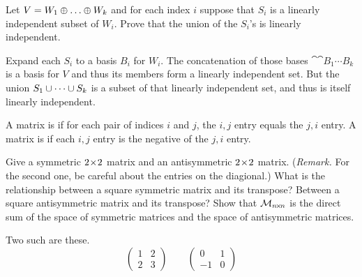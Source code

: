 \begin{exercises}
\begin{answer}
    \end{answer}
  \item 
    Let \( V=W_1\directsum\dots\directsum W_k \) and for each index
    \( i \) suppose that \( S_i \) is a linearly independent subset of
    \( W_i \).
    Prove that the union of the \( S_i \)'s is linearly independent.
    \begin{answer}
      Expand each \( S_i \) to a basis $B_i$ for \( W_i \).
      The concatenation of those bases $\cat{\cat{B_1}{\cdots}}{B_k}$
      is a basis for \( V \) and thus its members form a linearly independent
      set.
      But the union $S_1\cup\cdots\cup S_k$ is a subset 
      of that linearly independent set, and thus is
      itself linearly independent.  
     \end{answer}
  \item 
    A matrix is %
    if for each pair of indices \( i \) and
    \( j \), the \( i,j \) entry equals the \( j,i \) entry.
    A matrix is %
    if each \( i,j \) entry is the
    negative of the \( j,i \) entry.
    \begin{exparts}
      \partsitem Give a symmetric $2 \! \times \! 2$ matrix and an antisymmetric
        $2 \! \times \! 2$ matrix.
        (\textit{Remark.}
        For the second one, be careful about the entries on the diagional.)
      \partsitem What is the relationship between a square symmetric matrix and
        its transpose?
        Between a square antisymmetric matrix and its transpose?
      \partsitem Show that \( \mathcal{M}_{n \! \times \! n} \) is the direct sum of 
        the space of symmetric matrices and the space of antisymmetric 
        matrices.
    \end{exparts}
    \begin{answer}
      \begin{exparts}
        \partsitem Two such are these.
          \begin{equation*}
            \begin{pmatrix}
              1  &2  \\
              2  &3
            \end{pmatrix}
            \qquad
            \begin{pmatrix}
              0  &1  \\
              -1 &0
            \end{pmatrix}
          \end{equation*}

\end{exparts}
\end{answer}
\end{exercises}
